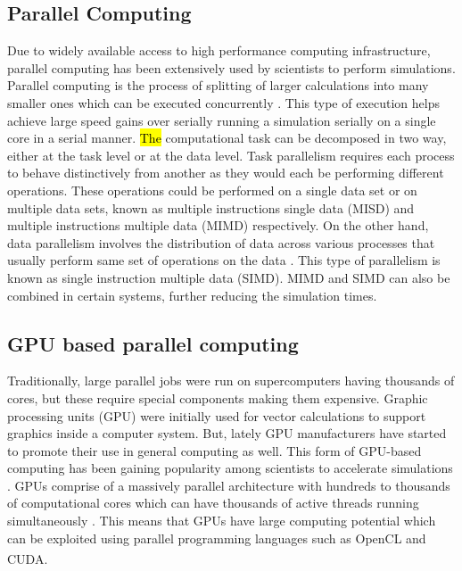 \documentclass[review]{elsarticle}
\begin{document}
\begin{linenumbers}
\subsection{Parallel Computing}
Due to widely available access to high performance computing infrastructure, 
parallel computing has been extensively used by scientists to perform simulations. 
Parallel computing is the process of splitting of larger calculations into 
many smaller ones which can be executed concurrently \citep{Almasi1989}. This type of execution 
helps achieve large speed gains over serially running a simulation serially 
on a single core in a serial manner. \hl{The} computational task can be decomposed in two way, either
at the task level or at the data level. Task parallelism requires each process to 
behave distinctively from another as they would each be performing different operations. 
These operations could be performed on a single data set or on multiple data 
sets, known as multiple instructions single data (MISD) and multiple instructions 
multiple data (MIMD) respectively. On the other hand, data parallelism 
involves the distribution of data across various processes that usually perform same set of 
operations on the data \citep{solihin2015}. This type of parallelism is known 
as single instruction multiple data (SIMD). MIMD and SIMD can also 
be combined in certain systems, further reducing the simulation times.

\subsection{GPU based parallel computing}
Traditionally, large parallel jobs were run on supercomputers having thousands 
of cores, but these require special components making them expensive.
Graphic processing units (GPU) were initially used for vector calculations to support 
graphics inside a computer system. But, lately GPU manufacturers have started to promote their use in 
general computing as well. This form of GPU-based computing has been gaining popularity among scientists 
to accelerate simulations \citep{kandrot2011}. GPUs comprise of a 
massively parallel architecture with hundreds to thousands of computational cores 
which can have thousands of active threads running simultaneously \citep{keckler2011}. 
This means that GPUs have large computing potential which can be exploited using parallel 
programming languages such as OpenCL and CUDA\textsuperscript{\tiny\textregistered}. 


\end{linenumbers}
\end{document}
